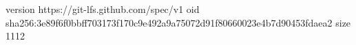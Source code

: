 version https://git-lfs.github.com/spec/v1
oid sha256:3e89f6f0bbff703173f170c9e492a9a75072d91f80660023e4b7d90453fdaea2
size 1112

